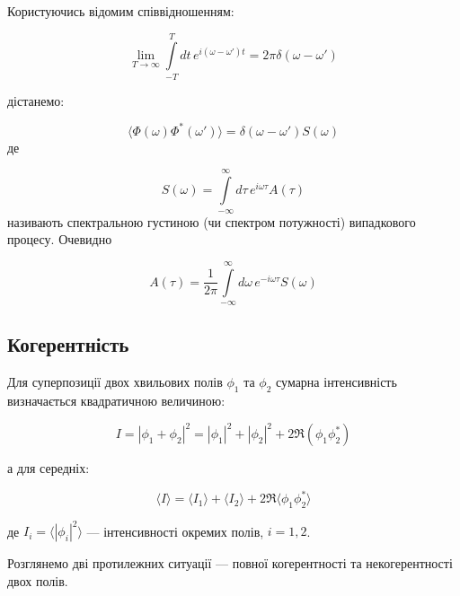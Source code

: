 Користуючись відомим співвідношенням:

\begin{equation*}
\lim_{T \to \infty} \int\limits_{-T}^{T} dt \, e^{i(\omega - \omega')t} = 2\pi \delta(\omega - \omega')
\end{equation*}

дістанемо:

\begin{equation}
\langle \Phi(\omega) \Phi^{*}(\omega') \rangle = \delta(\omega - \omega') S(\omega)
\label{eq:spectral_density}
\end{equation}
де

\begin{equation*}
S(\omega) = \int\limits_{-\infty}^{\infty} d\tau \, e^{i\omega \tau} A(\tau)
\end{equation*}
називають спектральною густиною (чи спектром потужності) випадкового процесу. Очевидно

\begin{equation*}
A(\tau) = \frac{1}{2\pi} \int\limits_{-\infty}^{\infty} d\omega \, e^{-i\omega \tau} S(\omega)
\end{equation*}

\subsection*{Когерентність}

Для суперпозиції двох хвильових полів \(\phi_1\) та \(\phi_2\) сумарна інтенсивність визначається квадратичною величиною:

\begin{equation*}
I = |\phi_1 + \phi_2|^2 = |\phi_1|^2 + |\phi_2|^2 + 2 \Re(\phi_1 \phi_2^{*})
\end{equation*}

а для середніх:

\begin{equation}
\langle I \rangle = \langle I_1 \rangle + \langle I_2 \rangle + 2 \Re \langle \phi_1 \phi_2^{*} \rangle
\label{eq:intensity}
\end{equation}

де \( I_i = \langle |\phi_i|^2 \rangle \) --- інтенсивності окремих полів, \( i = 1, 2 \).

Розглянемо дві протилежних ситуації --- повної когерентності та некогерентності двох полів.

